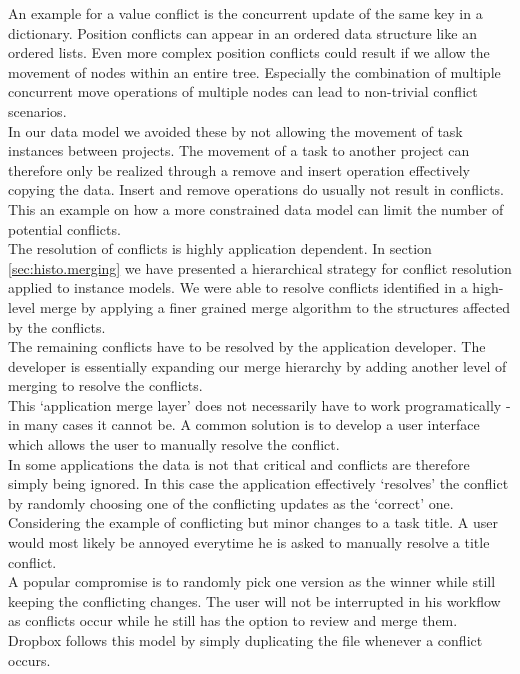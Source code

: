 An example for a value conflict is the concurrent update of the same key in a dictionary.
Position conflicts can appear in an ordered data structure like an ordered lists.
Even more complex position conflicts could result if we allow the movement of nodes within an entire tree.
Especially the combination of multiple concurrent move operations of multiple nodes can lead to non-trivial conflict scenarios.\\
In our data model we avoided these by not allowing the movement of task instances between projects.
The movement of a task to another project can therefore only be realized through a remove and insert operation effectively copying the data.
Insert and remove operations do usually not result in conflicts.
This an example on how a more constrained data model can limit the number of potential conflicts.\\
The resolution of conflicts is highly application dependent.
In section \ref{sec:histo.merging} we have presented a hierarchical strategy for conflict resolution applied to instance models.
We were able to resolve conflicts identified in a high-level merge by applying a finer grained merge algorithm to the structures affected by the conflicts.\\
The remaining conflicts have to be resolved by the application developer.
The developer is essentially expanding our merge hierarchy by adding another level of merging to resolve the conflicts.\\
This `application merge layer' does not necessarily have to work programatically - in many cases it cannot be.
A common solution is to develop a user interface which allows the user to manually resolve the conflict.\\
In some applications the data is not that critical and conflicts are therefore simply being ignored.
In this case the application effectively `resolves' the conflict by randomly choosing one of the conflicting updates as the `correct' one.\\
Considering the example of conflicting but minor changes to a task title.
A user would most likely be annoyed everytime he is asked to manually resolve a title conflict.\\
A popular compromise is to randomly pick one version as the winner while still keeping the conflicting changes.
The user will not be interrupted in his workflow as conflicts occur while he still has the option to review and merge them.\\
Dropbox follows this model by simply duplicating the file whenever a conflict occurs.
